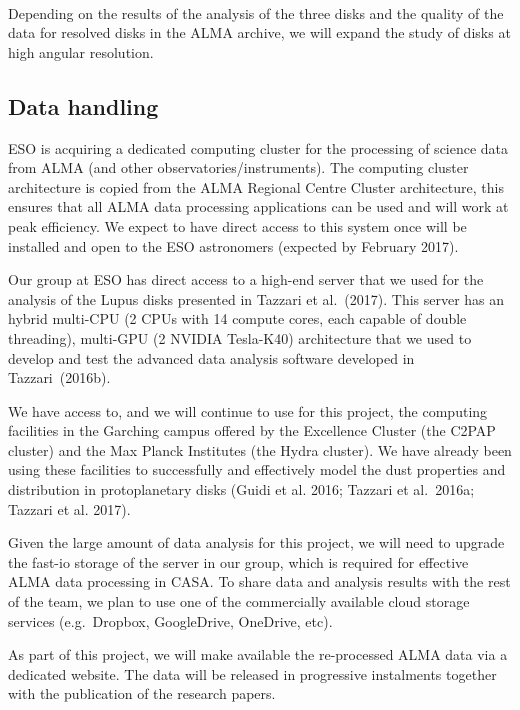 \documentclass[10pt,fleqn,twoside]{article}
\begin{document}
\vspace{1em}{\Tcol\bf Months 25-36}\\
Depending on the results of the analysis of the three disks and the quality of the data for resolved disks in the ALMA archive, we will expand the study of disks at high angular resolution. 


\subsection{Data handling}

ESO is acquiring a dedicated computing cluster for the processing of science data from ALMA (and other observatories/instruments). The computing cluster architecture is copied from the ALMA Regional Centre Cluster architecture, this ensures that all ALMA data processing applications can be used and will work at peak efficiency. We expect to have direct access to this system once will be installed and open to the ESO astronomers (expected by February 2017). 

Our group at ESO has direct access to a high-end server that we used for the analysis of the Lupus disks presented in Tazzari et al.~(2017). This server has an hybrid multi-CPU (2 CPUs with 14 compute cores, each capable of double threading), multi-GPU (2 NVIDIA Tesla-K40) architecture that we used to develop and test the advanced data analysis software developed in Tazzari~(2016b). 

We have access to, and we will continue to use for this project, the computing facilities in the Garching campus offered by the Excellence Cluster (the C2PAP cluster) and the Max Planck Institutes (the Hydra cluster). We have already been using these facilities to successfully and effectively model the dust properties and distribution in protoplanetary disks (Guidi et al. 2016; Tazzari et al.~2016a; Tazzari et al. 2017).

Given the large amount of data analysis for this project, we will need to upgrade the fast-io storage of the server in our group, which is required for effective ALMA data processing in CASA. To share data and analysis results with the rest of the team, we plan to use one of the commercially available cloud storage services (e.g.\ Dropbox, GoogleDrive, OneDrive, etc). 

As part of this project, we will make available the re-processed ALMA data via a dedicated website. The data will be released in progressive instalments together with the publication of the research papers.
\end{document}
